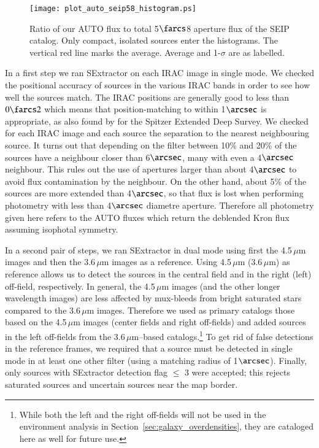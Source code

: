 \documentclass[mathleft,fleqn,%
]{an}
\begin{document}
\begin{figure}
  \texttt{[image: plot\_auto\_seip58\_histogram.ps]}
  \caption{
   Ratio of our AUTO flux to total 5$\farcs$8 aperture flux of the
   SEIP catalog. Only compact, isolated sources enter 
   the histograms.
   The vertical red line marks the average.
   Average and 1-$\sigma$ are as labelled.
  }
  \label{fig_comparison_seip}
\end{figure}

In a first step we ran SExtractor on each IRAC image in
single mode. 
We checked the positional accuracy of sources in the
various IRAC bands in order to see how well the sources match.
The IRAC positions are generally good to
less than $0\farcs2$ which means that position-matching to
within 1$\arcsec$ is appropriate, 
as also found by \citet{Ashby13} for the Spitzer
Extended Deep Survey. 
We checked for each IRAC image and each source the
separation to the nearest neighbouring source.
It turns out that depending on the filter between 10\% and 20\%
of the sources have a neighbour 
closer than 6$\arcsec$, many with even a 4$\arcsec$ neighbour. 
This rules out the use of
apertures larger than about 4$\arcsec$ to avoid flux contamination by
the neighbour. 
On the other hand, about 5\%  of the  
sources are more extended than 4$\arcsec$, so that flux is lost when
performing photometry with less than 4$\arcsec$
diametre aperture.
Therefore all photometry given here refers to the AUTO fluxes which
return the deblended Kron flux assuming isophotal symmetry. 

In a second pair of steps, we ran SExtractor  
in dual mode using first
the 4.5\,$\mu$m images and then the 3.6\,$\mu$m images as a reference. 
Using 4.5\,$\mu$m (3.6\,$\mu$m) as reference allows us to detect the 
sources in the central
field and in the right (left) off-field, respectively.
In general, the 4.5\,$\mu$m images (and the other longer wavelength 
images) are less affected by
mux-bleeds from bright saturated stars compared to the 3.6\,$\mu$m images. 
Therefore we used as primary catalogs those based on the 4.5\,$\mu$m
images (center fields and right off-fields) and added sources in the
left off-fields from the 3.6\,$\mu$m--based 
catalogs.\footnote{While both the left and the right off-fields
  will not be used in the environment analysis 
in Section~\ref{sec:galaxy_overdensities}, they are
cataloged here as well for future use.}
To get rid of false detections in the reference frames, 
we required that a source must be detected in single mode in at
least one other filter (using a matching radius of 1$\arcsec$). 
Finally, only sources with SExtractor detection flag $\le$ 3 were
accepted; this rejects saturated sources and uncertain sources near
the map border.
\end{document}
